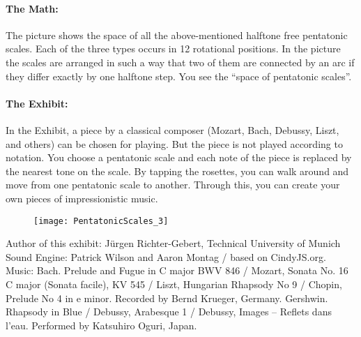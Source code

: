 \paragraph{The Math:} The picture shows the space of all the above-mentioned halftone free pentatonic scales. Each of the three types occurs in 12 rotational positions. In the picture the scales are arranged in such a way that two of them are connected by an arc if they differ exactly by one halftone step. You see the ``space of pentatonic scales''.

\paragraph{The Exhibit:} In the Exhibit, a piece by a classical composer (Mozart, Bach, Debussy, Liszt, and others) can be chosen for playing. But the piece is not played according to notation. You choose a pentatonic scale and each note of the piece is replaced by the nearest tone on the scale. By tapping the rosettes, you can walk around and move from one pentatonic scale to another. Through this, you can create your own pieces of impressionistic music.

\begin{figure}
\centering
\texttt{[image: PentatonicScales\_3]}
\end{figure}

\vfill

Author of this exhibit: Jürgen Richter-Gebert, Technical University of Munich 
Sound Engine: Patrick Wilson and Aaron Montag / based on CindyJS.org.
Music: Bach. Prelude and Fugue in C major BWV 846 / Mozart, Sonata No. 16 C major (Sonata facile), KV 545 / Liszt, Hungarian Rhapsody No 9 / Chopin, Prelude No 4  in e minor. Recorded by Bernd Krueger, Germany.
Gershwin. Rhapsody in Blue / Debussy, Arabesque 1 / Debussy, Images -- Reflets dans l'eau. Performed by Katsuhiro Oguri, Japan.

